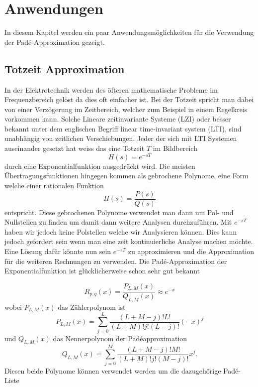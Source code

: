 %
%
%
\section{Anwendungen
\label{pade:section:Anwendungen}}

In diesem Kapitel werden ein paar Anwendungsmöglichkeiten für die Verwendung der Padé-Approximation gezeigt.



\subsection{Totzeit Approximation
\label{pade:subsection:totzeit}}

In der Elektrotechnik werden des öfteren mathematische Probleme im Frequenzbereich gelöst da dies oft einfacher ist.
Bei der Totzeit spricht man dabei von einer Verzögerung im Zeitbereich, welcher zum Beispiel in einem Regelkreis vorkommen kann.
Solche Lineare zeitinvariante Systeme (LZI) oder besser bekannt unter dem englischen Begriff linear time-invariant system (LTI), sind unabhängig von zeitlichen Verschiebungen. 
Jeder der sich mit LTI Systemen auseinander gesetzt hat weiss das eine Totzeit $T$ im Bildbereich
\begin{equation*}
H(s) = e^{-sT}
\end{equation*}
durch eine Exponentialfunktion ausgedrückt wird.
Die meisten Übertragungsfunktionen hingegen kommen als gebrochene Polynome, eine Form welche einer rationalen Funktion
\begin{equation*}
H(s)=\frac{P(s)}{Q(s)}
\end{equation*}
entspricht.
Diese gebrochenen Polynome verwendet man dann um Pol- und Nullstellen zu finden um damit dann weitere Analysen durchzuführen. 
Mit $e^{-sT}$ haben wir jedoch keine Polstellen welche wir Analysieren können.
Dies kann jedoch gefordert sein wenn man eine zeit kontinuierliche Analyse machen möchte.
Eine Lösung dafür könnte nun sein $e^{-sT}$ zu approximieren und die Approximation für die weiteren Rechnungen zu verwenden.
Die Padé-Approximation der Exponentialfunktion ist glücklicherweise schon sehr gut bekannt \cite{pade:moler}

\begin{equation}
R_{p, q}(x)
=
\frac{P_{L, M}(x)}{Q_{L, M}(x)} \approx e^{-x}
\end{equation}
wobei $P_{L, M}(x)$ das Zählerpolynom ist
\begin{equation}
P_{L, M}(x)
=
\sum_{j=0}^{L} \frac{(L+M-j) ! L !}{(L+M) ! j !(L-j) !}(-x)^{j}
\end{equation}
und $Q_{L, M}(x)$ das Nennerpolynom der Padéapproximation
\begin{equation}
Q_{L, M}(x)
=
\sum_{j=0}^{M} \frac{(L+M-j) ! M !}{(L+M) ! j !(M-j) !} x^{j}.
\end{equation}
Diesen beide Polynome können verwendet werden um die dazugehörige Padé-Liste 

